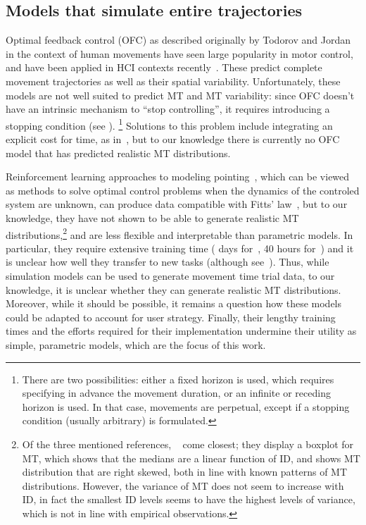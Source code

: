 \documentclass[acmlarge, manuscript,review]{acmart}
\begin{document}
\subsection{Models that simulate entire trajectories\label{rw:simulators}}
Optimal feedback control (OFC) as described originally by Todorov and Jordan~\cite{todorov2002} in the context of human movements have seen large popularity in motor control, and have been applied in HCI contexts recently~\cite{klar2023,fischer2022}. These predict complete movement trajectories as well as their spatial variability.
Unfortunately, these models are not well suited to predict MT and MT variability: since OFC doesn't have an intrinsic mechanism to ``stop controlling'', it requires introducing a stopping condition (see \eg \cite[Section 3.4]{qian2013}). \footnote{There are two possibilities: either a fixed horizon is used, which requires specifying in advance the movement duration, or an infinite or receding horizon is used. In that case, movements are perpetual, except if a stopping condition (usually arbitrary) is formulated.}
Solutions to this problem include integrating an explicit cost for time, as in~\cite{berret2016}, but to our knowledge there is currently no OFC model that has predicted realistic MT distributions.

\smallskip

Reinforcement learning approaches to modeling pointing~\cite{ikkala2022, charaja2024, fischer2021,do2021,moon2024}, which can be viewed as methods to solve optimal control problems when the dynamics of the controled system are unknown, can produce data compatible with Fitts' law~\cite{ikkala2022, charaja2024, fischer2021}, but to our knowledge, they have not shown to be able to generate realistic MT distributions,\footnote{Of the three mentioned references, \citeauthor{fischer2021}~\cite{fischer2021} come closest; they display a boxplot for MT, which shows that the medians are a linear function of ID, and shows MT distribution that are right skewed, both in line with known patterns of MT distributions. However, the variance of MT does not seem to increase with ID, in fact the smallest ID levels seems to have the highest levels of variance, which is not in line with empirical observations.} and are less flexible and interpretable than parametric models. In particular, they require extensive training time ( days for~\cite{do2021}, 40 hours for~\cite{moon2024}) and it is unclear how well they transfer to new tasks (although see~\cite{moon2024}).
Thus, while simulation models can be used to generate movement time trial data, to our knowledge, it is unclear whether they can generate realistic MT distributions. Moreover, while it should be possible, it remains a question how these models could be adapted to account for user strategy. Finally, their lengthy training times and the efforts required for their implementation undermine their utility as simple, parametric models, which are the focus of this work.
\end{document}
